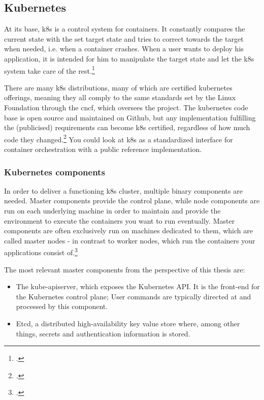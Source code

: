 \subsection{Kubernetes}
At its base, \gls{k8s} is a control system for containers.
It constantly compares the current state with the set target state and tries to correct towards the target when needed, i.e. when a container crashes.
When a user wants to deploy his application, it is intended for him to manipulate the target state and let the \gls{k8s} system take care of the rest.\footcite{k8sBasics}

There are many \gls{k8s} distributions, many of which are certified kubernetes offerings, meaning they all comply to the same standards set by the Linux Foundation through the \gls{cncf}, which oversees the project.
The kubernetes code base is open source and maintained on Github, but any implementation fulfilling the (publicised) requirements can become \gls{k8s} certified, regardless of how much code they changed.\footcite{cncf} You could look at \gls{k8s} as a standardized interface for container orchestration with a public reference implementation.

\subsubsection{Kubernetes components}

In order to deliver a functioning \gls{k8s} cluster, multiple binary components are needed.
Master components provide the control plane, while node components are run on each underlying machine in order to maintain and provide the environment to execute the containers you want to run eventually.
Master components are often exclusively run on machines dedicated to them, which are called master nodes - in contrast to worker nodes, which run the containers your applications consist of.\footcite{k8sComponents}

The most relevant master components from the perspective of this thesis are:
\begin{itemize}

\item The kube-apiserver, which exposes the Kubernetes API. It is the front-end for the Kubernetes control plane; User commands are typically directed at and processed by this component.

\item Etcd, a distributed high-availability key value store where, among other things, secrets and authentication information is stored.

\end{itemize}

